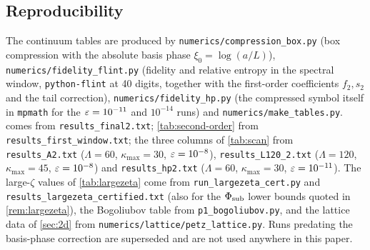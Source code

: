 \subsection{Reproducibility}
The continuum tables are produced by \texttt{numerics/compression\_box.py} (box
compression with the absolute basis phase $\xi_0=\log(a/L)$),
\texttt{numerics/fidelity\_flint.py} (fidelity and relative entropy in the
spectral window, \texttt{python-flint} at 40 digits, together with the
first-order coefficients $f_2,s_2$ and the tail correction),
\texttt{numerics/fidelity\_hp.py} (the compressed symbol itself in \texttt{mpmath}
for the $\varepsilon=10^{-11}$ and $10^{-14}$ runs) and
\texttt{numerics/make\_tables.py}.   comes from
\texttt{results\_final2.txt}; \cref{tab:second-order} from
\texttt{results\_first\_window.txt}; the three columns of \cref{tab:scan} from
\texttt{results\_A2.txt} ($\Lambda=60$, $\kappa_{\max}=30$, $\varepsilon=10^{-8}$),
\texttt{results\_L120\_2.txt} ($\Lambda=120$, $\kappa_{\max}=45$, $\varepsilon=10^{-8}$)
and \texttt{results\_hp2.txt} ($\Lambda=60$, $\kappa_{\max}=30$, $\varepsilon=10^{-11}$).
The large-$\zeta$ values of \cref{tab:largezeta} come from
\texttt{run\_largezeta\_cert.py} and \texttt{results\_largezeta\_certified.txt}
(also for the $\Phi_{\rm sub}$ lower bounds quoted in \cref{rem:largezeta}), the
Bogoliubov table from \texttt{p1\_bogoliubov.py}, and the lattice data of
\cref{sec:2d} from \texttt{numerics/lattice/petz\_lattice.py}.  Runs predating the
basis-phase correction are superseded and are not used anywhere in this paper.

